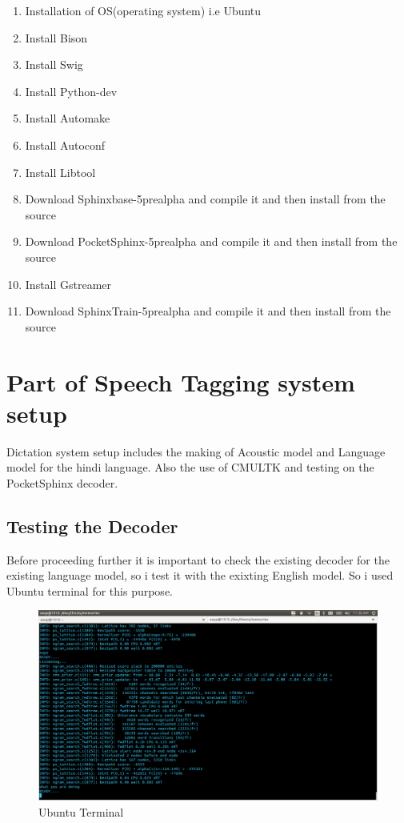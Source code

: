 \documentclass[12pt,a4paper,oneside]{memoir}
\begin{document}
\begin{enumerate}
  \item Installation of OS(operating system) i.e Ubuntu
  \item Install Bison 
  \item Install Swig
  \item Install Python-dev
  \item Install Automake 
  \item Install Autoconf
  \item Install Libtool
  \item Download Sphinxbase-5prealpha and compile it and then install from the source
  \item Download PocketSphinx-5prealpha and compile it and then install from the source
  \item Install Gstreamer  
  \item Download SphinxTrain-5prealpha and compile it and then install from the source	
\end{enumerate}

\section{Part of Speech Tagging system setup}
Dictation system setup includes the making of Acoustic model and Language model for the hindi language. Also the use of CMULTK and testing on the PocketSphinx decoder.

\subsection{Testing the Decoder}
Before proceeding further it is important to check the existing decoder for the existing language model, so i test it with the exixting English model.
So i used Ubuntu terminal for this purpose.\\ 

\begin{figure}[h]
    \centering
    \includegraphics[scale=0.3]{Screenshot1}
    \caption{Ubuntu Terminal}
\end{figure}
\end{document}
